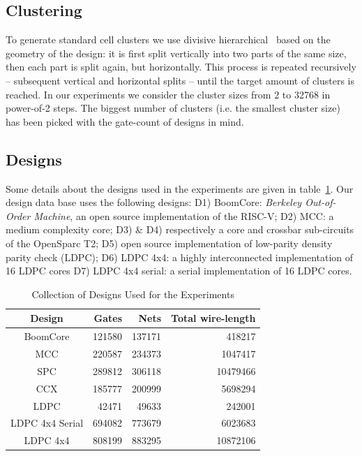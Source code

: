 \documentclass[conference]{IEEEtran}
\begin{document}
\subsection{Clustering}
To generate standard cell clusters we use divisive hierarchical~\cite{Rokach2005} based on the geometry of the design: it is first split vertically into two parts of the same size, then each part is split again, but horizontally.
This process is repeated recursively -- subsequent vertical and horizontal splits -- until the target amount of clusters is reached. In our experiments we consider the cluster sizes from 2 to 32768 in power-of-2 steps. The biggest number of clusters (i.e. the smallest cluster size) has been picked with the gate-count of designs in mind.

\subsection{Designs}
Some details about the designs used in the experiments are given in table~\ref{tab:designs}.
Our design data base uses the following designs: D1) BoomCore: \textit{Berkeley Out-of-Order Machine}, an open source implementation of the RISC-V; D2) MCC: a medium complexity core; D3) \& D4) respectively a core and crossbar sub-circuits of the OpenSparc T2; D5) open source implementation of low-parity density parity check (LDPC); D6) LDPC 4x4: a highly interconnected implementation of 16 LDPC cores D7) LDPC 4x4 serial: a serial implementation of 16 LDPC cores.

\begin{table}[!t]
\renewcommand{\arraystretch}{1.3}
\caption{Collection of Designs Used for the Experiments}
\label{tab:designs}
\centering


\begin{tabular}{||c|r|r|r||}
\hline
Design & Gates & Nets & Total wire-length\\
\hline
\hline
BoomCore & 121580 & 137171 & 418217\\
\hline
MCC & 220587 & 234373 & 1047417 \\
\hline
SPC & 289812 & 306118 & 10479466\\
\hline
CCX & 185777 & 200999 & 5698294\\
\hline
LDPC & 42471 & 49633 & 242001\\
\hline
LDPC 4x4 Serial & 694082 & 773679 & 6023683\\
\hline
LDPC 4x4 & 808199 & 883295 & 10872106\\
\hline
\end{tabular}
\end{table}
\end{document}
